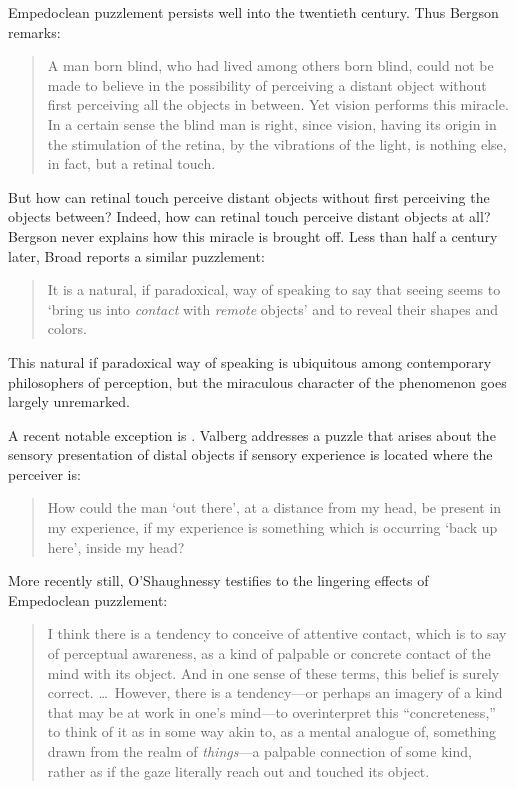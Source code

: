 Empedoclean puzzlement persists well into the twentieth century. Thus Bergson remarks:
\begin{quote}
	A man born blind, who had lived among others born blind, could not be made to believe in the possibility of perceiving a distant object without first perceiving all the objects in between. Yet vision performs this miracle. In a certain sense the blind man is right, since vision, having its origin in the stimulation of the retina, by the vibrations of the light, is nothing else, in fact, but a retinal touch. \citep[168]{Bergson:1907sh}
\end{quote}
But how can retinal touch perceive distant objects without first perceiving the objects between? Indeed, how can retinal touch perceive distant objects at all? Bergson never explains how this miracle is brought off. Less than half a century later, Broad reports a similar puzzlement:
\begin{quote}
    It is a natural, if paradoxical, way of speaking to say that seeing seems to `bring us into \emph{contact} with \emph{remote} objects' and to reveal their shapes and colors. \citep[33]{Broad:1952kx}
\end{quote}
This natural if paradoxical way of speaking is ubiquitous among contemporary philosophers of perception, but the miraculous character of the phenomenon goes largely unremarked. 

A recent notable exception is \citet{Valberg:1992aa}. Valberg addresses a puzzle that arises about the sensory presentation of distal objects if sensory experience is located where the perceiver is:
\begin{quote}
	How could the man `out there', at a distance from my head, be present in my experience, if my experience is something which is occurring `back up here', inside my head? \citep[141]{Valberg:1992aa}
\end{quote}
More recently still, O'Shaughnessy testifies to the lingering effects of Empedoclean puzzlement:
\begin{quote}
	I think there is a tendency to conceive of attentive contact, which is to say of perceptual awareness, as a kind of palpable or concrete contact of the mind with its object. And in one sense of these terms, this belief is surely correct. \ldots\ However, there is a tendency---or perhaps an imagery of a kind that may be at work in one's mind---to overinterpret this ``concreteness,'' to think of it as in some way akin to, as a mental analogue of, something drawn from the realm of \emph{things}---a palpable connection of some kind, rather as if the gaze literally reach out and touched its object. \citep[183]{OShaughnessy:2003eu}
\end{quote}

